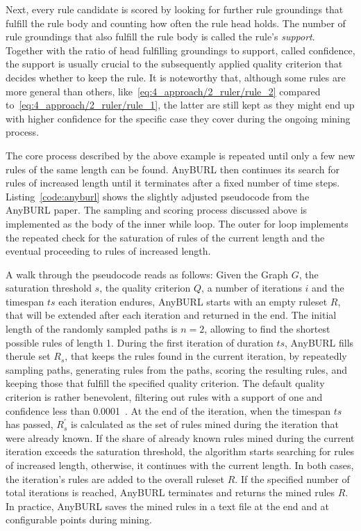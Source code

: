 Next, every rule candidate is scored by looking for further rule groundings that fulfill the rule body and counting how often the rule head holds. The number of rule groundings that also fulfill the rule body is called the rule's \emph{support}. Together with the ratio of head fulfilling groundings to support, called confidence, the support is usually crucial to the subsequently applied quality criterion that decides whether to keep the rule. It is noteworthy that, although some rules are more general than others, like~\ref{eq:4_approach/2_ruler/rule_2} compared to~\ref{eq:4_approach/2_ruler/rule_1}, the latter are still kept as they might end up with higher confidence for the specific case they cover during the ongoing mining process.

The core process described by the above example is repeated until only a few new rules of the same length can be found. AnyBURL then continues its search for rules of increased length until it terminates after a fixed number of time steps. Listing~\ref{code:anyburl} shows the slightly adjusted pseudocode from the AnyBURL paper. The sampling and scoring process discussed above is implemented as the body of the inner while loop. The outer for loop implements the repeated check for the saturation of rules of the current length and the eventual proceeding to rules of increased length.

A walk through the pseudocode reads as follows: Given the Graph $G$, the saturation threshold $s$, the quality criterion $Q$, a number of iterations $i$ and the timespan $ts$ each iteration endures, AnyBURL starts with an empty ruleset $R$, that will be extended after each iteration and returned in the end. The initial length of the randomly sampled paths is $n=2$, allowing to find the shortest possible rules of length 1. During the first iteration of duration $ts$, AnyBURL fills therule set $R_s$, that keeps the rules found in the current iteration, by repeatedly sampling paths, generating rules from the paths, scoring the resulting rules, and keeping those that fulfill the specified quality criterion. The default quality criterion is rather benevolent, filtering out rules with a support of one and confidence less than 0.0001~\cite{AnyBURL}. At the end of the iteration, when the timespan $ts$ has passed, $R_s^{'}$ is calculated as the set of rules mined during the iteration that were already known. If the share of already known rules mined during the current iteration exceeds the saturation threshold, the algorithm starts searching for rules of increased length, otherwise, it continues with the current length. In both cases, the iteration's rules are added to the overall ruleset $R$. If the specified number of total iterations is reached, AnyBURL terminates and returns the mined rules $R$. In practice, AnyBURL saves the mined rules in a text file at the end and at configurable points during mining.

